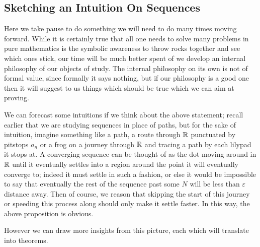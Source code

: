 \documentclass[11pt]{article}
\begin{document}
\subsection{Sketching an Intuition On Sequences}

Here we take pause to do something we will need to do many times moving forward. While it is certainly true that all one needs to solve many problems in pure mathematics is the symbolic awareness to throw rocks together and see which ones stick, our time will be much better spent of we develop an internal philosophy of our objects of study. The internal philosophy on its own is not of formal value, since formally it says nothing, but if our philosophy is a good one then it will suggest to us things which should be true which we can aim at proving.

We can forecast some intuitions if we think about the above statement; recall earlier that we are studying sequences in place of paths, but for the sake of intuition, imagine something like a path, a route through $\mathbb{R}$ punctuated by pitstops $a_n$ or a frog on a journey through $\mathbb{R}$ and tracing a path by each lilypad it stops at. A converging sequence can be thought of as the dot moving around in $\mathbb{R}$ until it eventually settles into a region around the point it will eventually converge to; indeed it must settle in such a fashion, or else it would be impossible to say that eventually the rest of the sequence past some $N$ will be less than $\varepsilon$ distance away. Then of course, we reason that skipping the start of this journey or speeding this process along should only make it settle faster. In this way, the above proposition is obvious.

However we can draw more insights from this picture, each which will translate into theorems.

\end{document}
